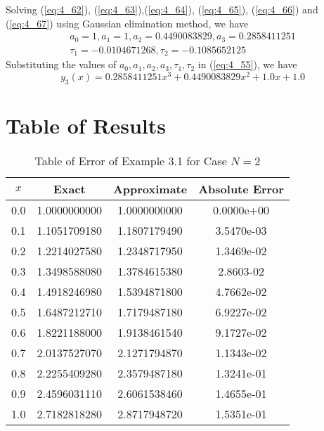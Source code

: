 \documentclass[12pt]{report}
\newcommand{\refn}[1]{(\ref{#1})}
\newcommand{\refx}[1]{\refn{eq:#1}}
\begin{document}
	Solving \refx{4_62}, \refx{4_63},\refx{4_64}, \refx{4_65}, \refx{4_66} and \refx{4_67} using Gaussian elimination method, we have
	\begin{equation*}
		\begin{array}{c}
			a_0=1, a_1=1, a_2=0.4490083829, a_3=0.2858411251\\
			\tau_1 = -0.0104671268, \tau_2 = -0.1085652125
		\end{array}
	\end{equation*}
	Substituting the values of $a_0, a_1, a_2, a_3, \tau_1, \tau_2$ in \refx{4_55}, we have
	\begin{equation*}
		y_3(x) = 0.2858411251x^3 + 0.4490083829x^2 + 1.0x + 1.0
	\end{equation*}
	
	\section{Table of Results}
	
	\begin{table}[!hbt]
		\caption{Table of Error of Example 3.1 for Case $N=2$}
		\begin{center}
			\begin{tabular}{|c||c||c||c||}
				\hline
				$x$ & Exact & Approximate & Absolute Error\\ \hline
				0.0 & 1.0000000000 & 1.0000000000 & 0.0000e+00\\ \hline
				0.1 & 1.1051709180 & 1.1807179490 & 3.5470e-03\\ \hline
				0.2 & 1.2214027580 & 1.2348717950 & 1.3469e-02\\ \hline
				0.3 & 1.3498588080 & 1.3784615380 & 2.8603-02\\ \hline
				0.4 & 1.4918246980 & 1.5394871800 & 4.7662e-02\\ \hline
				0.5 & 1.6487212710 & 1.7179487180 & 6.9227e-02\\ \hline
				0.6 & 1.8221188000 & 1.9138461540 & 9.1727e-02\\ \hline
				0.7 & 2.0137527070 & 2.1271794870 & 1.1343e-02\\ \hline
				0.8 & 2.2255409280 & 2.3579487180 & 1.3241e-01\\ \hline
				0.9 & 2.4596031110 & 2.6061538460 & 1.4655e-01\\ \hline
				1.0 & 2.7182818280 & 2.8717948720 & 1.5351e-01\\ \hline
			\end{tabular}
		\end{center}
		\label{tb:4_1}
	\end{table}
\end{document}
